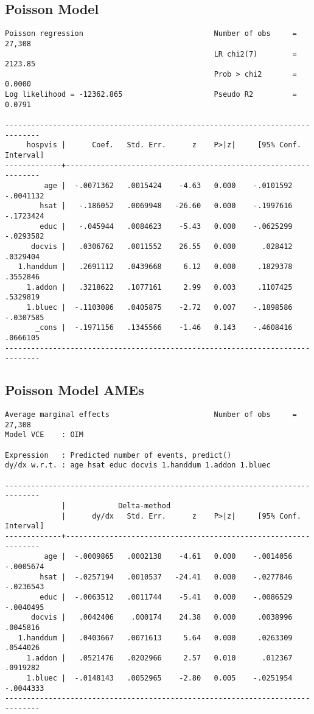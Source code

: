 \documentclass{article}
\begin{document}
\newpage
\hypertarget{poisson}{\subsection*{Poisson Model}}
\begin{verbatim}
Poisson regression                              Number of obs     =     27,308
                                                LR chi2(7)        =    2123.85
                                                Prob > chi2       =     0.0000
Log likelihood = -12362.865                     Pseudo R2         =     0.0791

------------------------------------------------------------------------------
     hospvis |      Coef.   Std. Err.      z    P>|z|     [95% Conf. Interval]
-------------+----------------------------------------------------------------
         age |  -.0071362   .0015424    -4.63   0.000    -.0101592   -.0041132
        hsat |   -.186052   .0069948   -26.60   0.000    -.1997616   -.1723424
        educ |   -.045944   .0084623    -5.43   0.000    -.0625299   -.0293582
      docvis |   .0306762   .0011552    26.55   0.000      .028412    .0329404
   1.handdum |   .2691112   .0439668     6.12   0.000     .1829378    .3552846
     1.addon |   .3218622   .1077161     2.99   0.003     .1107425    .5329819
     1.bluec |  -.1103086   .0405875    -2.72   0.007    -.1898586   -.0307585
       _cons |  -.1971156   .1345566    -1.46   0.143    -.4608416    .0666105
------------------------------------------------------------------------------
\end{verbatim}

\newpage
\hypertarget{margins}{\subsection*{Poisson Model AMEs}}
\begin{verbatim}
Average marginal effects                        Number of obs     =     27,308
Model VCE    : OIM

Expression   : Predicted number of events, predict()
dy/dx w.r.t. : age hsat educ docvis 1.handdum 1.addon 1.bluec

------------------------------------------------------------------------------
             |            Delta-method
             |      dy/dx   Std. Err.      z    P>|z|     [95% Conf. Interval]
-------------+----------------------------------------------------------------
         age |  -.0009865   .0002138    -4.61   0.000    -.0014056   -.0005674
        hsat |  -.0257194   .0010537   -24.41   0.000    -.0277846   -.0236543
        educ |  -.0063512   .0011744    -5.41   0.000    -.0086529   -.0040495
      docvis |   .0042406    .000174    24.38   0.000     .0038996    .0045816
   1.handdum |   .0403667   .0071613     5.64   0.000     .0263309    .0544026
     1.addon |   .0521476   .0202966     2.57   0.010      .012367    .0919282
     1.bluec |  -.0148143   .0052965    -2.80   0.005    -.0251954   -.0044333
------------------------------------------------------------------------------
\end{verbatim}
\end{document}
